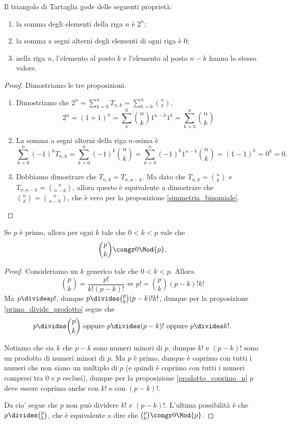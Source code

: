 \begin{proposition}
    Il triangolo di Tartaglia gode delle seguenti proprietà:
    \begin{enumerate}
        \item la somma degli elementi della riga $n$ è $2^n$;
        \item la somma a segni alterni degli elementi di ogni riga è $0$;
        \item nella riga $n$, l'elemento al posto $k$ e l'elemento al posto $n-k$ hanno lo stesso valore.
    \end{enumerate}
\end{proposition}
\begin{proof}
    Dimostriamo le tre proposizioni.
    \begin{enumerate}
        \item Dimostriamo che $2^n = \sum_{k=0}^n T_{n, k} = \sum_{k=0}^n \binom{n}{k}$.
        \[2^n = (1+1)^n = \sum_k^0 \binom{n}{k}1^{n-k}1^k = \sum_{k=0}^n \binom{n}{k}\]
        \item La somma a segni alterni della riga $n$-esima è \[\sum_{k=0}^n (-1)^kT_{n, k} = \sum_{k=0}^n (-1)^k\binom{n}{k} = \sum_{k=0}^n (-1)^k1^{n-k}\binom{n}{k} = (1-1)^k = 0^k = 0.\]
        \item Dobbiamo dimostrare che $T_{n, k} = T_{n, n-k}$. Ma dato che $T_{n, k} = \binom{n}{k}$ e $T_{n, n-k} = \binom{n}{n-k}$, allora questo è equivalente a dimostrare che $\binom{n}{k} = \binom{n}{n-k}$, che è vero per la proposizione \ref{simmetria_binomiale}. \qedhere
    \end{enumerate}
\end{proof}

\begin{proposition}\label{binomio_pk_divisibile_p}
    Se $p$ è primo, allora per ogni $k$ tale che $0 < k < p$ vale che
    \begin{equation}
        \binom{p}{k} \congr 0 \Mod{p}.
    \end{equation}
\end{proposition}
\begin{proof}
    Consideriamo un $k$ generico tale che $0 < k < p$.
    Allora \[
        \binom{p}{k} = \frac{p!}{k!(p-k)!} \iff p! = \binom{p}{k}(p-k)!k!    
    \]
    Ma $p \divides p!$, dunque $p \divides \binom{p}{k}(p-k)!k!$, dunque per la proposizione \ref{primo_divide_prodotto} segue che \[
        p \divides \binom{p}{k} \text{ oppure } p \divides (p-k)! \text{ oppure } p \divides k!
    .\]

    Notiamo che sia $k$ che $p-k$ sono numeri minori di $p$, dunque $k!$ e $(p-k)!$ sono un prodotto di numeri minori di $p$. Ma $p$ è primo, dunque è coprimo con tutti i numeri che non siano un multiplo di $p$ (e quindi è coprimo con tutti i numeri compresi tra $0$ e $p$ esclusi), dunque per la proposizione \ref{prodotto_coprimo_n} $p$ deve essere coprimo anche con $k!$ e con $(p-k)!$. 
    
    Da cio' segue che $p$ non può dividere $k!$ e $(p-k)!$.
    L'ultima possibilità è che $p \divides \binom{p}{k}$, che è equivalente a dire che $\binom{p}{k} \congr 0 \Mod{p}$.
\end{proof}

